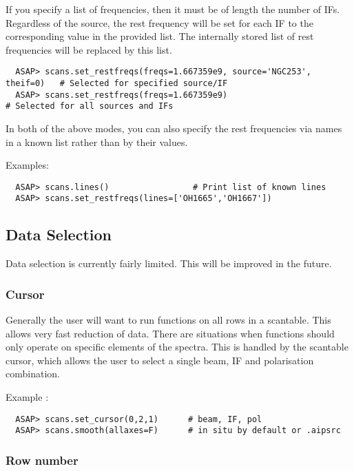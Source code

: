\documentclass[11pt]{article}
\begin{document}
If you specify a list of frequencies, then it must be of length the
number of IFs.  Regardless of the source, the rest frequency will be set
for each IF to the corresponding value in the provided list.  The
internally stored list of rest frequencies will be replaced by this
list.


\begin{verbatim}
  ASAP> scans.set_restfreqs(freqs=1.667359e9, source='NGC253', theif=0)   # Selected for specified source/IF
  ASAP> scans.set_restfreqs(freqs=1.667359e9)                             # Selected for all sources and IFs
\end{verbatim}


In both of the above modes, you can also specify the rest frequencies via
names in a known list rather than by their values.

Examples:

\begin{verbatim}
  ASAP> scans.lines()                 # Print list of known lines
  ASAP> scans.set_restfreqs(lines=['OH1665','OH1667'])
\end{verbatim}

  

\subsection{Data Selection}

Data selection is currently fairly limited. This will be improved in
the future. 


\subsubsection{Cursor}

Generally the user will want to run functions on all rows in a
scantable. This allows very fast reduction of data. There are situations
when functions should only operate on specific elements of the spectra. This
is handled by the scantable cursor, which allows the user to select a
single beam, IF and polarisation combination.

Example :

\begin{verbatim}
  ASAP> scans.set_cursor(0,2,1)      # beam, IF, pol
  ASAP> scans.smooth(allaxes=F)      # in situ by default or .aipsrc
\end{verbatim}

\subsubsection{Row number}
\end{document}
